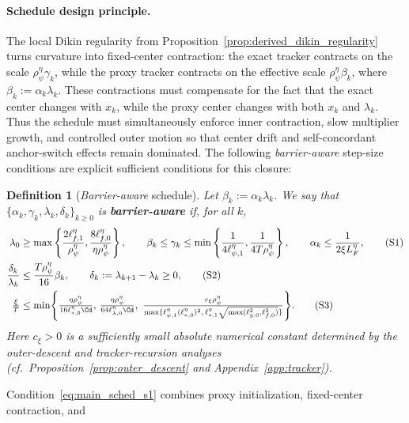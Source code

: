 \documentclass{article}
\newtheorem{definition}{Definition}
\begin{document}
\paragraph{Schedule design principle.}
The local Dikin regularity from Proposition~\ref{prop:derived_dikin_regularity} turns curvature into
fixed-center contraction: the exact tracker contracts on the scale \(\rho_{\psi}^\eta\gamma_k\),
while the proxy tracker contracts on the effective scale \(\rho_{\psi}^\eta\beta_k\), where
\(\beta_k:=\alpha_k\lambda_k\). These contractions must compensate for the fact that the exact
center changes with \(x_k\), while the proxy center changes with both \(x_k\) and \(\lambda_k\).
Thus the schedule must simultaneously enforce inner contraction, slow multiplier growth, and
controlled outer motion so that center drift and self-concordant anchor-switch effects remain
dominated. The following \textit{barrier-aware} step-size conditions are explicit sufficient conditions for this
closure:
\begin{definition}[\textit{Barrier-aware} schedule]
\label{def:barrier_aware}
Let \(\beta_k:=\alpha_k\lambda_k\). We say that
\(\{\alpha_k,\gamma_k,\lambda_k,\delta_k\}_{k\ge0}\) is \textbf{barrier-aware} if, for all \(k\),
\begin{align}
\lambda_0 &\ge
\max\left\{
\frac{2\ell_{f,1}^{\eta}}{\rho_{\psi}^{\eta}},
\frac{8\ell_{f,0}^{\eta}}{\eta\rho_{\psi}^{\eta}}
\right\},
\qquad
\beta_k\le \gamma_k\le
\min\left\{
\frac{1}{4\ell_{\psi,1}^{\eta}},
\frac{1}{4T\rho_{\psi}^{\eta}}
\right\},
\qquad
\alpha_k\le \frac{1}{2\xi L_F^{\eta}},
\tag{S1}\label{eq:main_sched_s1}\\
\frac{\delta_k}{\lambda_k}
&\le
\frac{T\rho_{\psi}^{\eta}}{16}\beta_k,
\qquad
\delta_k:=\lambda_{k+1}-\lambda_k\ge0,
\tag{S2}\label{eq:main_sched_s2}\\
\tfrac{\xi}{T}
&\le
\min\Biggl\{
\tfrac{\eta\rho_{\psi}^{\eta}}{16\ell_{*,0}^{\eta}\Cd},\,
\tfrac{\eta\rho_{\psi}^{\eta}}{64\ell_{\lambda,0}^{\eta}\Cd},\,
\,\tfrac{c_\xi\rho_\psi^\eta}
{\max\{\ell_{\psi,1}^\eta(\ell_{*,0}^\eta)^2,\,\ell_{*,1}^\eta\sqrt{\max(\ell_{g,0}^2,\ell_{f,0}^2)}\}}
\Biggr\}.
\tag{S3}\label{eq:main_sched_s3}
\end{align}
Here \(c_\xi>0\) is a sufficiently small absolute numerical constant determined by the
outer-descent and tracker-recursion analyses (cf.\ Proposition~\ref{prop:outer_descent} and
Appendix~\ref{app:tracker}).
\end{definition}
Condition~\eqref{eq:main_sched_s1} combines proxy initialization, fixed-center contraction, and
\end{document}
